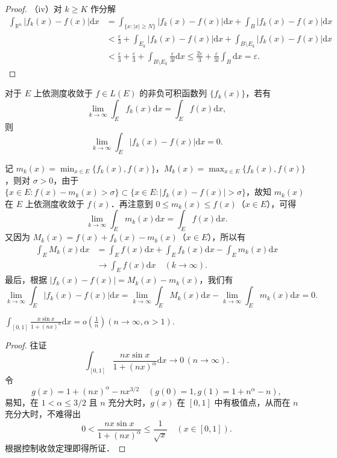 \documentclass[../../main.tex]{subfiles}
\begin{document}
\begin{proof}
（iv）对 \( k \geqslant K \) 作分解
\begin{align*}
\int_{\mathbb{R}^n} |f_k(x) - f(x)| \mathrm{d}x &= \int_{\{ x : |x| \geqslant N \}} |f_k(x) - f(x)| \mathrm{d}x + \int_{B} |f_k(x) - f(x)| \mathrm{d}x \\
&< \frac{\varepsilon}{3} + \int_{E_k} |f_k(x) - f(x)| \mathrm{d}x + \int_{B \setminus E_k} |f_k(x) - f(x)| \mathrm{d}x \\
&< \frac{\varepsilon}{3} + \frac{\varepsilon}{3} + \int_{B \setminus E_k} \frac{\varepsilon}{3l} \mathrm{d}x \leqslant \frac{2\varepsilon}{3} + \frac{\varepsilon}{3l} \int_{B} \mathrm{d}x = \varepsilon.
\end{align*}

\end{proof}
\begin{remark}
对于 \( E \) 上依测度收敛于 \( f \in L(E) \) 的非负可积函数列 \( \{ f_k(x) \} \)，若有
\[
\lim_{k \to \infty} \int_E f_k(x) \mathrm{d}x = \int_E f(x) \mathrm{d}x,
\]
则
\[
\lim_{k \to \infty} \int_E |f_k(x) - f(x)| \mathrm{d}x = 0.
\]

记 \( m_k(x) = \min_{x \in E} \{ f_k(x), f(x) \} \)，\( M_k(x) = \max_{x \in E} \{ f_k(x), f(x) \} \)，则对 \( \sigma > 0 \)，由于 \( \{ x \in E : f(x) - m_k(x) > \sigma \} \subset \{ x \in E : |f_k(x) - f(x)| > \sigma \} \)，故知 \( m_k(x) \) 在 \( E \) 上依测度收敛于 \( f(x) \)．再注意到 \( 0 \leqslant m_k(x) \leqslant f(x) \)（\( x \in E \)），可得
\[
\lim_{k \to \infty} \int_E m_k(x) \mathrm{d}x = \int_E f(x) \mathrm{d}x.
\]
又因为 \( M_k(x) = f(x) + f_k(x) - m_k(x) \)（\( x \in E \)），所以有
\begin{align*}
\int_E M_k(x) \mathrm{d}x &= \int_E f(x) \mathrm{d}x + \int_E f_k(x) \mathrm{d}x - \int_E m_k(x) \mathrm{d}x \\
&\to \int_E f(x) \mathrm{d}x \quad (k \to \infty).
\end{align*}
最后，根据 \( |f_k(x) - f(x)| = M_k(x) - m_k(x) \)，我们有
\[
\lim_{k \to \infty} \int_E |f_k(x) - f(x)| \mathrm{d}x = \lim_{k \to \infty} \int_E M_k(x) \mathrm{d}x - \lim_{k \to \infty} \int_E m_k(x) \mathrm{d}x = 0.
\]
\end{remark}

\begin{example}
$\int_{[0,1]} \frac{x\sin x}{1 + (nx)^\alpha} \mathrm{d}x = o\left( \frac{1}{n} \right) (n \to \infty, \alpha > 1).$
\end{example}
\begin{proof}
往证
\[
\int_{[0,1]} \frac{nx\sin x}{1 + (nx)^\alpha} \mathrm{d}x \to 0 \, (n \to \infty).
\]
令
\[
g(x) = 1 + (nx)^\alpha - nx^{3/2} \quad (g(0) = 1, g(1) = 1 + n^\alpha - n),
\]
易知，在 \(1 < \alpha \leqslant 3/2\) 且 \(n\) 充分大时，\(g(x)\) 在 \([0,1]\) 中有极值点，从而在 \(n\) 充分大时，不难得出
\[
0 < \frac{nx\sin x}{1 + (nx)^\alpha} \leqslant \frac{1}{\sqrt{x}} \quad (x \in [0,1]).
\]
根据控制收敛定理即得所证．

\end{proof}
\end{document}
